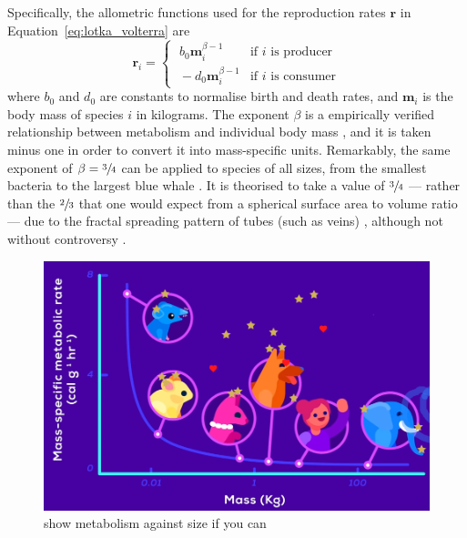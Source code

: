 Specifically, the allometric functions used for the reproduction rates $\mathbf{r}$ in Equation~\eqref{eq:lotka_volterra} are
\begin{equation}
  \mathbf{r}_i =
  \begin{cases}
    \;b_0\mathbf{m}_i^{\beta-1} & \text{if $i$ is producer}\\
    \;-d_0\mathbf{m}_i^{\beta-1} & \text{if $i$ is consumer}
  \end{cases}
  \label{eq:metabolism_beta}
\end{equation}
where $b_0$ and $d_0$ are constants to normalise birth and death rates, and $\mathbf{m}_i$ is the body mass of species $i$ in kilograms. The exponent $\beta$ is a empirically verified relationship between metabolism and individual body mass \cite{Brown2004}, and it is taken minus one in order to convert it into mass-specific units.
Remarkably, the same exponent of $\beta=\sfrac{3}{4}$ can be applied to species of all sizes, from the smallest bacteria to the largest blue whale \cite{Kleiber1947}. It is theorised to take a value of $\sfrac{3}{4}$ --- rather than the $\sfrac{2}{3}$ that one would expect from a spherical surface area to volume ratio --- due to the fractal spreading pattern of tubes (such as veins) \cite{West1997}, although not without controversy \cite{Agutter2004}.

\begin{figure}
    \centering
    \includegraphics[width=.8\textwidth]{joy/metabolism.png}
    \caption[A plot of metabolism against individual body mass]{show metabolism against size if you can}
    \label{fig:metabolism}
\end{figure}

